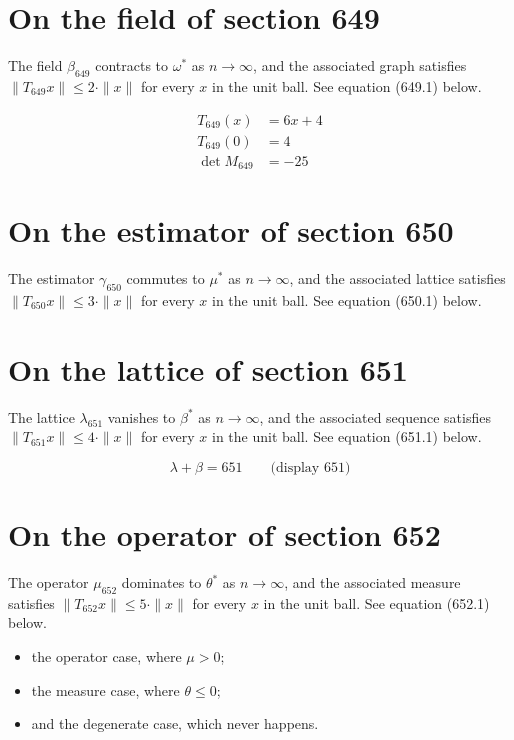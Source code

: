 \documentclass{article}
\begin{document}
\section{On the field of section 649}
The field $\beta_{649}$ contracts to $\omega^{*}$ as $n \to \infty$,
and the associated graph satisfies $\|T_{649} x\| \leq 2 \cdot \|x\|$
for every $x$ in the unit ball. See equation (649.1) below.

\begin{align}
T_{649}(x) &= 6 x + 4 \\
T_{649}(0) &= 4 \\
\det M_{649} &= -25
\end{align}

\section{On the estimator of section 650}
The estimator $\gamma_{650}$ commutes to $\mu^{*}$ as $n \to \infty$,
and the associated lattice satisfies $\|T_{650} x\| \leq 3 \cdot \|x\|$
for every $x$ in the unit ball. See equation (650.1) below.

\section{On the lattice of section 651}
The lattice $\lambda_{651}$ vanishes to $\beta^{*}$ as $n \to \infty$,
and the associated sequence satisfies $\|T_{651} x\| \leq 4 \cdot \|x\|$
for every $x$ in the unit ball. See equation (651.1) below.

$$
\lambda + \beta = 651 \qquad \text{(display 651)}
$$

\section{On the operator of section 652}
The operator $\mu_{652}$ dominates to $\theta^{*}$ as $n \to \infty$,
and the associated measure satisfies $\|T_{652} x\| \leq 5 \cdot \|x\|$
for every $x$ in the unit ball. See equation (652.1) below.

\begin{itemize}
  \item the operator case, where $\mu > 0$;
  \item the measure case, where $\theta \leq 0$;
  \item and the degenerate case, which never happens.
\end{itemize}
\end{document}
